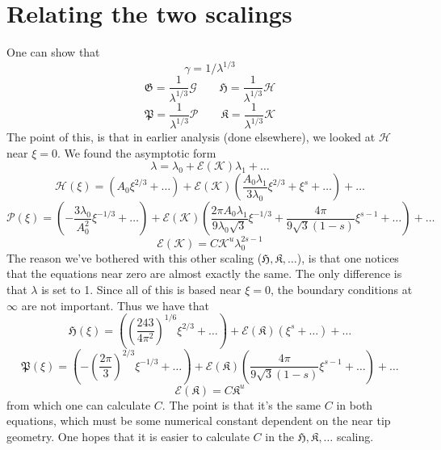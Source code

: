 \documentclass{article}
\newcommand{\cE}{\mathcal{E}}
\newcommand{\fP}{\mathfrak{P}}
\newcommand{\fH}{\mathfrak{H}}
\newcommand{\fG}{\mathfrak{G}}
\newcommand{\fK}{\mathfrak{K}}
\newcommand{\sP}{\mathscr{P}}
\newcommand{\sH}{\mathscr{H}}
\newcommand{\sG}{\mathscr{G}}
\newcommand{\sK}{\mathscr{K}}
\begin{document}
\section{Relating the two scalings}
One can show that 
\[\gamma = 1/\lambda^{1/3} \]
\[\fG = \frac{1}{\lambda^{1/3}} \sG \qquad \fH = \frac{1}{\lambda^{1/3}} \sH\]
\[\fP = \frac{1}{\lambda^{1/3}} \sP \qquad \fK = \frac{1}{\lambda^{1/3}} \sK\]
The point of this, is that in earlier analysis (done elsewhere), we looked 
at $\sH$ near $\xi=0$. We found the asymptotic form
\[ \lambda = \lambda_0 + \cE(\sK)\lambda_1 + \dots \]
%
\[ \sH(\xi) = (A_0\xi^{2/3}+\dots) + \cE(\sK)\left(\frac{A_0 \lambda_1}
{3 \lambda_0} \xi^{2/3} + \xi^s + \dots \right) + \dots \]
%
\[ \sP(\xi) = (-\frac{3\lambda_0}{A_0^2}\xi^{-1/3}+\dots) + \cE(\sK)
\left(\frac{2\pi A_0 \lambda_1}{9 \lambda_0 \sqrt{3}} \xi^{-1/3} + 
\frac{4\pi}{9\sqrt{3}(1-s)}\xi^{s-1} + \dots \right) + \dots \]
%
\[ \cE(\sK) = C \sK^u \lambda_0^{2s-1}\]
The reason we've bothered with this other scaling ($\fH,\fK,\dots$), is 
that one notices that the equations near zero are almost exactly the same. 
The only difference is that $\lambda$ is set to 1. Since all of this is based 
near $\xi=0$, the boundary conditions at $\infty$ are not important. Thus we 
have that 
\[ \fH(\xi) = \left( \left(\frac{243}{4\pi^2}\right)^{1/6} \xi^{2/3}+\dots
\right) + \cE(\fK)\left( \xi^s + \dots \right) + \dots \]
%
\[ \fP(\xi) = \left(-\left( \frac{2\pi}{3} \right)^{2/3} 
\xi^{-1/3}+\dots \right) + \cE(\fK)
\left( \frac{4\pi}{9\sqrt{3}(1-s)}\xi^{s-1} + \dots \right) + \dots \]
%
\[ \cE(\fK) = C \fK^u\]
from which one can calculate $C$. The point is that it's the same $C$ in both
equations, which must be some numerical constant dependent on the near tip
geometry. One hopes that it is easier to calculate $C$ in the $\fH,\fK,\dots$
scaling.

%
%
%
%
%
%
\end{document}

